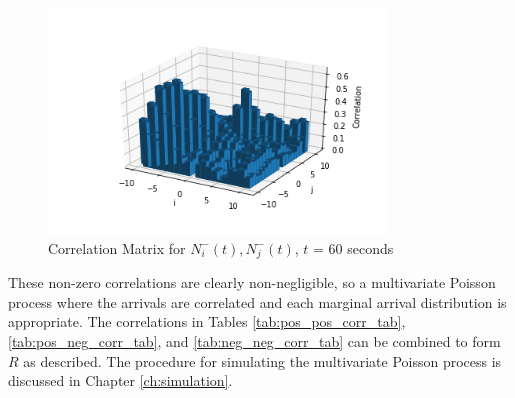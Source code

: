 \begin{figure}[t]
\begin{center}
\caption{Correlation Matrix for $N^{-}_i(t), N^{-}_j(t)$, $t$ = 60 seconds}
\label{fig:neg_neg_corr_pic}
\includegraphics[width=0.8\textwidth]{LaTeX/Figures/neg_neg_correlations.png}
\end{center}
\end{figure}

These non-zero correlations are clearly non-negligible, so a multivariate Poisson process where the arrivals are correlated and each marginal arrival distribution is appropriate. The correlations in Tables \ref{tab:pos_pos_corr_tab}, \ref{tab:pos_neg_corr_tab}, and \ref{tab:neg_neg_corr_tab} can be combined to form $R$ as described. The procedure for simulating the multivariate Poisson process is discussed in Chapter \ref{ch:simulation}.

